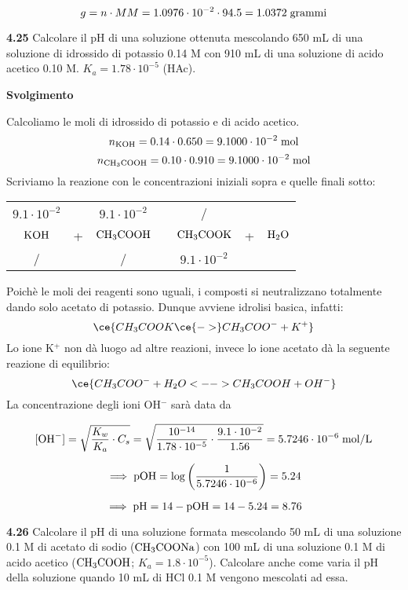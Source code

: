 $$g=n \cdot MM=1.0976 \cdot 10^{-2} \cdot 94.5=1.0372 \; \rm grammi$$

\vspace{0.2cm}\textbf{4.25} Calcolare il pH di una soluzione ottenuta mescolando 650 mL di una soluzione di idrossido di potassio 0.14 M con 910 mL di una soluzione di acido acetico 0.10 M. $K_a = 1.78 \cdot 10^{-5}$ (HAc).

\vspace{0.2cm}\large\textbf{Svolgimento}\normalsize

\vspace{0.2cm}Calcoliamo le moli di idrossido di potassio e di acido acetico.
$$n_{\rm KOH}=0.14\cdot 0.650 = 9.1000\cdot 10^{-2} \; \rm mol$$
$$n_{\rm CH_3COOH}=0.10\cdot 0.910 = 9.1000\cdot 10^{-2} \; \rm mol$$
Scriviamo la reazione con le concentrazioni iniziali sopra e quelle finali sotto:

\begin{center}
    \begin{tabular}{ccccccc}
        $9.1\cdot 10^{-2}$ &  & $9.1\cdot 10^{-2}$ & & / &&\\
        $\rm KOH$ & + & $\rm CH_3COOH$ & \ce{->} & $\rm CH_3COOK$ & + & $\rm H_2O$\\
        / &  &  / & & $9.1\cdot 10^{-2}$ &&\\
    \end{tabular}
\end{center}

Poichè le moli dei reagenti sono uguali, i composti si neutralizzano totalmente dando solo acetato di potassio. Dunque avviene idrolisi basica, infatti:
$$\ce{CH_3COOK \ce{->} CH_3COO^- + K^+}$$
Lo ione K$^+$ non dà luogo ad altre reazioni, invece lo ione acetato dà la seguente reazione di equilibrio:
$$\ce{CH_3COO^- + H_2O <--> CH_3COOH + OH^-}$$
La concentrazione degli ioni OH$^-$ sarà data da 

$$[\text{OH}^-]
=\sqrt{\frac{K_w}{K_a}\cdot C_s}
=\sqrt{\frac{10^{-14}}{1.78 \cdot 10^{-5}} \cdot \frac{9.1\cdot 10^{-2}}{1.56}}
=5.7246 \cdot 10^{-6} \; \rm mol/L$$

$$\implies \rm pOH
=\log{\left(\frac{1}{5.7246 \cdot 10^{-6}}\right)}
=5.24$$

$$\implies \rm pH=14-pOH=14-5.24=8.76$$

\vspace{0.2cm}\textbf{4.26} Calcolare il pH di una soluzione formata mescolando 50 mL di una soluzione 0.1 M di acetato di sodio ($\rm CH_3COONa$) con 100 mL di una soluzione 0.1 M di acido acetico ($\rm CH_3COOH$; $K_a=1.8 \cdot 10^{-5}$). Calcolare anche come varia il pH della soluzione quando 10 mL di HCl 0.1 M vengono mescolati ad essa.


